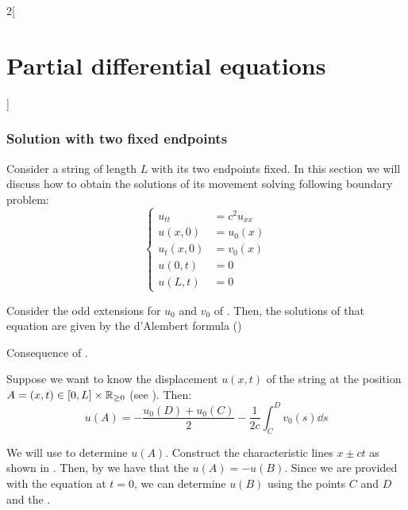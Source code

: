 \documentclass[../../../main_math.tex]{subfiles}
\begin{document}
\begin{multicols}{2}[\section{Partial differential equations}]
  \subsubsection{Solution with two fixed endpoints}
  \begin{definition}
    Consider a string of length $L$ with its two endpoints fixed. In this section we will discuss how to obtain the solutions of its movement solving following boundary problem:
    \begin{equation}\label{PDE:fixedendpoints}
      \left\{
      \begin{aligned}
        u_{tt}   & =c^2u_{xx} \\
        u(x,0)   & =u_0(x)    \\
        u_t(x,0) & =v_0(x)    \\
        u(0,t)   & =0         \\
        u(L,t)   & =0
      \end{aligned}
      \right.
    \end{equation}
  \end{definition}
  \begin{proposition}
    Consider the odd extensions for $u_0$ and $v_0$ of . Then, the solutions of that equation are given by the d'Alembert formula ()
  \end{proposition}
  \begin{sproof}
    Consequence of .
  \end{sproof}
  \begin{proposition}\label{PDE:methodchar}
    Suppose we want to know the displacement $u(x,t)$ of the string at the position $A=(x,t)\in[0,L]\times\mathbb{R}_{\geq 0}$ (see ). Then:
    $$u(A)=-\frac{u_0(D)+u_0(C)}{2}-\frac{1}{2c}\int_{C}^{D}v_0(s)\dd{s}$$
  \end{proposition}
  \begin{sproof}
    We will use  to determine $u(A)$. Construct the characteristic lines $x\pm ct$ as shown in . Then, by  we have that the $u(A) = - u(B)$. Since we are provided with the equation at $t=0$, we can determine $u(B)$ using the points $C$ and $D$ and the .
  \end{sproof}
  \begin{center}
    \begin{minipage}{\linewidth}
      \centering
      

\end{minipage}
\end{center}
\end{multicols}
\end{document}
